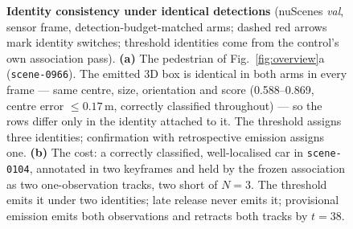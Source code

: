 \begin{figure}[t]
\caption{\textbf{Identity consistency under identical detections} (nuScenes \emph{val}, sensor frame, detection-budget-matched arms; dashed red arrows mark identity switches; threshold identities come from the control's own association pass).
\textbf{(a)} The pedestrian of Fig.~\ref{fig:overview}a (\texttt{scene-0966}). The emitted 3D box is identical in both arms in every frame --- same centre, size, orientation and score (0.588--0.869, centre error $\le 0.17$\,m, correctly classified throughout) --- so the rows differ only in the identity attached to it. The threshold assigns three identities; confirmation with retrospective emission assigns one.
\textbf{(b)} The cost: a correctly classified, well-localised car in \texttt{scene-0104}, annotated in two keyframes and held by the frozen association as two one-observation tracks, two short of $N{=}3$. The threshold emits it under two identities; late release never emits it; provisional emission emits both observations and retracts both tracks by $t{=}38$.}
\label{fig:identity_consistency}
\end{figure}
